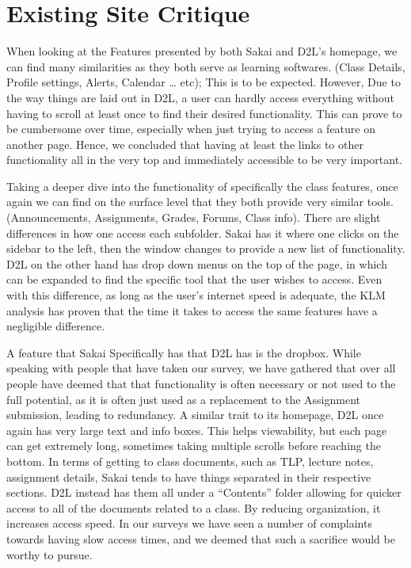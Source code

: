 \documentclass[12pt]{article}
\begin{document}
    \section{Existing Site Critique}\label{sec:existing-site-critique}

    When looking at the Features presented by both Sakai and D2L’s homepage, we can find many similarities as they both serve as learning softwares. (Class Details, Profile settings, Alerts, Calendar … etc); This is to be expected.
    However, Due to the way things are laid out in D2L, a user can hardly access everything without having to scroll at least once to find their desired functionality.
    This can prove to be cumbersome over time, especially when just trying to access a feature on another page.
    Hence, we concluded that having at least the links to other functionality all in the very top and immediately accessible to be very important.

    Taking a deeper dive into the functionality of specifically the class features, once again we can find on the surface level that they both provide very similar tools. (Announcements, Assignments, Grades, Forums, Class info).
    There are slight differences in how one access each subfolder.
    Sakai has it where one clicks on the sidebar to the left, then the window changes to provide a new list of functionality.
    D2L on the other hand has drop down menus on the top of the page, in which can be expanded to find the specific tool that the user wishes to access.
    Even with this difference, as long as the user’s internet speed is adequate, the KLM analysis has proven that the time it takes to access the same features have a negligible difference.

    A feature that Sakai Specifically has that D2L has is the dropbox.
    While speaking with people that have taken our survey, we have gathered that over all people have deemed that that functionality is often necessary or not used to the full potential, as it is often just used as a replacement to the Assignment submission, leading to redundancy.
    A similar trait to its homepage, D2L once again has very large text and info boxes.
    This helps viewability, but each page can get extremely long, sometimes taking multiple scrolls before reaching the bottom.
    In terms of getting to class documents, such as TLP, lecture notes, assignment details, Sakai tends to have things separated in their respective sections.
    D2L instead has them all under a “Contents” folder allowing for quicker access to all of the documents related to a class.
    By reducing organization, it increases access speed.
    In our surveys we have seen a number of complaints towards having slow access times, and we deemed that such a sacrifice would be worthy to pursue.
\end{document}
